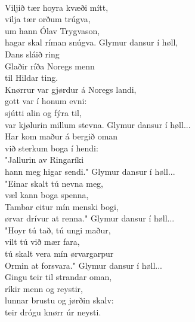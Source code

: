 \newpage
{}
\begin{flushleft}
\\
Viljið tær hoyra kvæði mítt,\\
vilja tær orðum trúgva,\\
um hann Ólav Trygvason,\\
hagar skal ríman snúgva.
\hops
\hspace{0.9cm}Glymur dansur í høll,\\
\hspace{0.9cm}Dans sláið ring\\
\hspace{0.9cm}Glaðir ríða Noregs menn\\
\hspace{0.9cm}til Hildar ting.
\hops
{}\\
Knørrur var gjørdur á Noregs landi,\\
gott var í honum evni:\\
sjútti alin og fýra til,\\
var kjølurin millum stevna.
\hops
\hspace{0.9cm}Glymur dansur í høll...
\hops
{}\\
Har kom maður á bergið oman\\
við sterkum boga í hendi:\\
"Jallurin av Ringaríki\\
hann meg higar sendi."
\hops
\hspace{0.9cm}Glymur dansur í høll...
\hops
{}\\
"Einar skalt tú nevna meg,\\
væl kann boga spenna,\\
Tambar eitur mín menski bogi,\\
ørvar drívur at renna."
\hops
\hspace{0.9cm}Glymur dansur í høll...
\hops
{}\\
"Hoyr tú tað, tú ungi maður,\\
vilt tú við mær fara,\\
tú skalt vera mín ørvargarpur\\
Ormin at forsvara."
\hops
\hspace{0.9cm}Glymur dansur í høll...
\newpage
{}\\
Gingu teir til strandar oman,\\
ríkir menn og reystir,\\
lunnar brustu og jørðin skalv:\\
teir drógu knørr úr neysti.

\end{flushleft}
